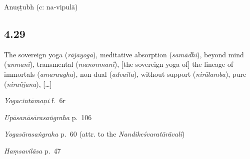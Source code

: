 \begin{ekdosis}
\begin{philcomm}[hp04_028]
\end{philcomm}

\begin{metre}[hp04_028]
Anuṣṭubh (c: na-vipulā)
\end{metre}

\subsection*{4.29}
\begin{translation}[hp04_029]
The sovereign yoga (\emph{rājayoga}), meditative absorption (\emph{samādhi}), beyond mind (\emph{unmanī}), transmental (\textit{manonmanī}), [the sovereign yoga of] the lineage of immortals (\emph{amaraugha}), non-dual (\emph{advaita}), without support (\emph{nirālamba}), pure (\emph{nirañjana}), [\dots]
\end{translation}
% 


\begin{testimonia}[hp04_029]
\emph{Yogacintāmaṇi} f.~6r
\begin{versinnote}
\end{versinnote}

\emph{Upāsanāsārasaṅgraha} p.~106
\begin{versinnote}
\end{versinnote}

\emph{Yogasārasaṅgraha} p.~60 (attr. to the \emph{Nandikeśvaratārāvalī})
\begin{versinnote}
\end{versinnote}

\emph{Haṃsavilāsa} p.~47
\begin{versinnote}
\end{versinnote}
\end{testimonia}


\end{ekdosis}
